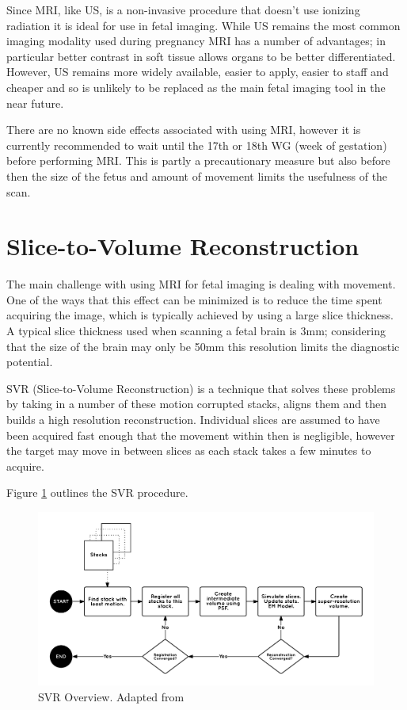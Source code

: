 Since MRI, like US, is a non-invasive procedure that doesn’t use ionizing radiation it is ideal for use in fetal imaging\cite{fetalmri}. While US remains the most common imaging modality used during pregnancy MRI has a number of advantages; in particular better contrast in soft tissue allows organs to be better differentiated. However, US remains more widely available, easier to apply, easier to staff and cheaper and so is unlikely to be replaced as the main fetal imaging tool in the near future.

There are no known side effects associated with using MRI, however it is currently recommended to wait until the 17th or 18th WG (week of gestation) before performing MRI. This is partly a precautionary measure but also before then the size of the fetus and amount of movement limits the usefulness of the scan\cite{fetalmri}.

\newpage
\section{Slice-to-Volume Reconstruction}\label{background:svr}
The main challenge with using MRI for fetal imaging is dealing with movement. One of the ways that this effect can be minimized is to reduce the time spent acquiring the image, which is typically achieved by using a large slice thickness. A typical slice thickness used when scanning a fetal brain is 3mm; considering that the size of the brain may only be 50mm this resolution limits the diagnostic potential.

SVR (Slice-to-Volume Reconstruction) is a technique that solves these problems by taking in a number of these motion corrupted stacks, aligns them and then builds a high resolution reconstruction. Individual slices are assumed to have been acquired fast enough that the movement within then is negligible, however the target may move in between slices as each stack takes a few minutes to acquire.

Figure \ref{fig:svroverview} outlines the SVR procedure.

\begin{figure}[H]
    \centering
	\includegraphics[width=1.0\textwidth]{images/background/svr_overview.png}
    \caption{SVR Overview. Adapted from \cite{gpureconstruction}}
    \label{fig:svroverview}
\end{figure}

